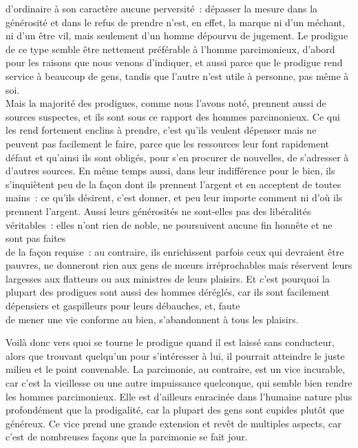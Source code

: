 \documentclass[french,twoside]{book} %
\begin{document}
d’ordinaire à son caractère aucune perversité : dépasser la mesure dans la générosité et dans le refus de prendre n’est, en effet, la marque ni d’un méchant, ni d’un être vil, mais seulement d’un homme dépourvu de jugement. Le prodigue de ce type semble être nettement préférable à l’homme parcimonieux, d’abord pour les raisons que nous venons d’indiquer, et aussi parce que le prodigue rend service à beaucoup de gens, tandis que l’autre n’est utile à personne, pas même à soi. \\
Mais la majorité des prodigues, comme nous l’avons noté, prennent aussi de sources suspectes, et ils sont sous ce rapport des hommes parcimonieux. Ce qui les rend fortement enclins à prendre, c’est qu’ils veulent dépenser mais ne peuvent pas facilement le faire, parce que les ressources leur font rapidement défaut et qu’ainsi ils sont obligés, pour s’en procurer de  nouvelles, de s’adresser à d’autres sources. En même temps aussi, dans leur indifférence pour le bien, ils s’inquiètent peu de la façon dont ils prennent l’argent et en acceptent de toutes mains : ce qu’ils désirent, c’est donner, et peu leur importe comment ni d’où ils prennent l’argent. Aussi leurs générosités ne sont-elles pas des libéralités véritables : elles n’ont rien de noble, ne poursuivent aucune fin honnête et ne sont pas faites \\
de la façon requise : au contraire, ils enrichissent parfois ceux qui devraient être pauvres, ne donneront rien aux gens de mœurs irréprochables mais réservent leurs largesses aux flatteurs ou aux ministres de leurs plaisirs. Et c’est pourquoi la plupart des prodigues sont aussi des hommes déréglés, car ils sont facilement dépensiers et gaspilleurs pour leurs débauches, et, faute \\
de mener une vie conforme au bien, s’abandonnent à tous les plaisirs.\par
Voilà donc vers quoi se tourne le prodigue quand il est laissé sans conducteur, alors que trouvant quelqu’un pour s’intéresser à lui, il pourrait atteindre le juste milieu et le point convenable. La parcimonie, au contraire, est un vice incurable, car c’est la vieillesse ou une autre impuissance quelconque, qui semble bien rendre les hommes parcimonieux. Elle est d’ailleurs enracinée dans l’humaine nature plus \\
profondément que la prodigalité, car la plupart des gens sont cupides plutôt que généreux. Ce vice prend une grande extension et revêt de multiples aspects, car c’est de nombreuses façons que la parcimonie se fait jour.\par
\end{document}

